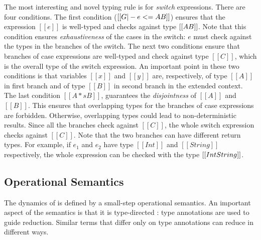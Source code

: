The most interesting and novel typing rule is for
\emph{switch} expressions. There are four conditions.
The first condition ($[[G |-
    e <= A \/ B]]$) ensures that the expression $[[e]]$ is well-typed
and checks against type $[[A \/ B]]$. Note that this condition ensures
\emph{exhaustiveness} of the cases in the switch: $e$ must
check against the types in the branches of the switch.
The next two conditions ensure that
branches of case expressions are well-typed and check against type
$[[C]]$, which is the overall type of the switch expression.
An important point in these two conditions is that variables
$[[x]]$ and $[[y]]$ are, respectively, of type $[[A]]$ in first branch and of type $[[B]]$ in
second branch in the extended context.
The last condition
$[[A *s B]]$, guarantees the \emph{disjointness} of $[[A]]$ and $[[B]]$.
This ensures that overlapping types for the branches of case expressions
are forbidden. Otherwise, overlapping types could lead to
non-deterministic results.
Since all the branches check against $[[C]]$, the whole
switch expression checks against $[[C]]$.
Note that the two branches can have different return types.
For example, if $e_1$ and $e_2$ have type $[[Int]]$ and $[[String]]$ respectively,
the whole expression can be checked with the type $[[Int \/ String]]$.

\begin{comment}
\begin{figure}[t]
  \begin{small}
    \centering
    \drules[typ]{$ [[G |- e dirflag A]] $}{Bi-directional Typing}{int, var, ann, app, sub, abs, typeof}
  \end{small}
  \caption{Typing for \cal.}
  \label{fig:union:typ}
\end{figure}
\end{comment}

\subsection{Operational Semantics}
\label{sec:union:os}
The dynamics of \cal is defined by a small-step operational semantics. An
important aspect of the semantics is that it is type-directed
\cite{Huang:typedirected}: type annotations are used to guide reduction.
Similar terms that differ only on type annotations can reduce in different
ways.

